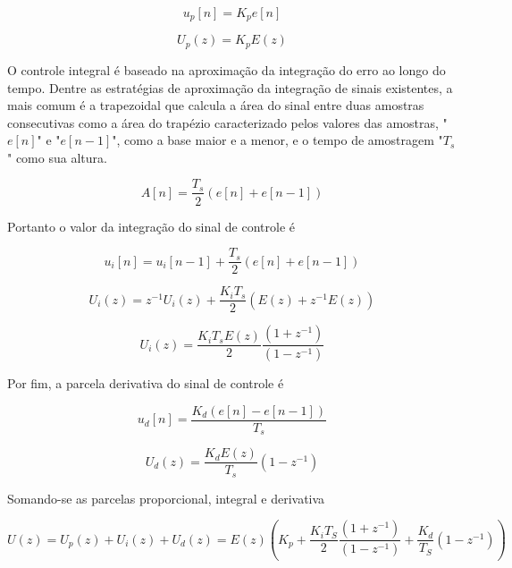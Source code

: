 \begin{equation}
    \label{eq:cd_6}
    u_p[n] = K_pe[n]
\end{equation}

\begin{equation}
    \label{eq:cd_6.1}
    U_p(z) = K_pE(z)
\end{equation}

O controle integral é baseado na aproximação da integração do erro ao longo do tempo. Dentre as estratégias de aproximação da integração de sinais existentes, a mais comum é a trapezoidal que calcula a área do sinal entre duas amostras consecutivas como a área do trapézio caracterizado pelos valores das amostras, "$e[n]$" e "$e[n-1]$", como a base maior e a menor, e o tempo de amostragem "$T_s$" como sua altura.

\begin{equation}
    \label{eq:cd_7}
    A[n] = \frac{T_s}{2} (e[n]+e[n-1])
\end{equation}

Portanto o valor da integração do sinal de controle é

\begin{equation}
    \label{eq:cd_8}
    u_i[n] = u_i[n-1] + \frac{T_s}{2} (e[n]+e[n-1])
\end{equation}


\begin{equation}
    \label{eq:cd_8.1}
    U_i(z) = z^{-1}U_i(z) + \frac{K_iT_s}{2} (E(z)+z^{-1}E(z))
\end{equation}

\begin{equation}
    \label{eq:cd_8.2}
    U_i(z) =\frac{K_iT_sE(z)}{2} \frac{(1+z^{-1})}{(1-z^{-1})}
\end{equation}

Por fim, a parcela derivativa do sinal de controle é

\begin{equation}
    \label{eq:cd_9}
    u_d[n] = \frac{K_d(e[n]-e[n-1])}{T_s}
\end{equation}

\begin{equation}
    \label{eq:cd_9.1}
    U_d(z) = \frac{K_dE(z)}{T_s} (1-z^{-1})
\end{equation}

Somando-se as parcelas proporcional, integral e derivativa

\begin{equation}
    \label{eq:cd_10}
    U(z) = U_p(z) + U_i(z) + U_d(z) = E(z)\left(K_p+\frac{K_iT_S}{2} \frac{(1+z^{-1})}{(1-z^{-1})} + \frac{K_d}{T_S}(1-z^{-1})\right)
\end{equation}

